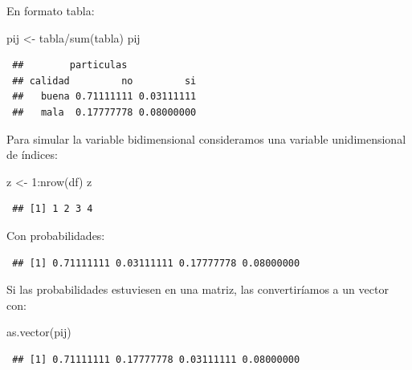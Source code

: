 \documentclass[
]{book}
\newenvironment{Shaded}{\begin{snugshade}}{\end{snugshade}}
\newcommand{\DecValTok}[1]{\textcolor[rgb]{0.00,0.00,0.81}{#1}}
\newcommand{\FunctionTok}[1]{\textcolor[rgb]{0.00,0.00,0.00}{#1}}
\newcommand{\NormalTok}[1]{#1}
\newcommand{\OtherTok}[1]{\textcolor[rgb]{0.56,0.35,0.01}{#1}}
\newcommand{\SpecialCharTok}[1]{\textcolor[rgb]{0.00,0.00,0.00}{#1}}
\theoremstyle{break}
\theoremstyle{nonumberplain}
\begin{document}
En formato tabla:

\begin{Shaded}
\begin{Highlighting}[]
\NormalTok{pij }\OtherTok{\textless{}{-}}\NormalTok{ tabla}\SpecialCharTok{/}\FunctionTok{sum}\NormalTok{(tabla)}
\NormalTok{pij}
\end{Highlighting}
\end{Shaded}

\begin{verbatim}
 ##        particulas
 ## calidad         no         si
 ##   buena 0.71111111 0.03111111
 ##   mala  0.17777778 0.08000000
\end{verbatim}

Para simular la variable bidimensional consideramos una variable unidimensional de índices:

\begin{Shaded}
\begin{Highlighting}[]
\NormalTok{z }\OtherTok{\textless{}{-}} \DecValTok{1}\SpecialCharTok{:}\FunctionTok{nrow}\NormalTok{(df)}
\NormalTok{z}
\end{Highlighting}
\end{Shaded}

\begin{verbatim}
 ## [1] 1 2 3 4
\end{verbatim}

Con probabilidades:

\begin{Shaded}
\end{Shaded}

\begin{verbatim}
 ## [1] 0.71111111 0.03111111 0.17777778 0.08000000
\end{verbatim}

Si las probabilidades estuviesen en una matriz, las convertiríamos a un vector con:

\begin{Shaded}
\begin{Highlighting}[]
\FunctionTok{as.vector}\NormalTok{(pij)}
\end{Highlighting}
\end{Shaded}

\begin{verbatim}
 ## [1] 0.71111111 0.17777778 0.03111111 0.08000000
\end{verbatim}
\end{document}
